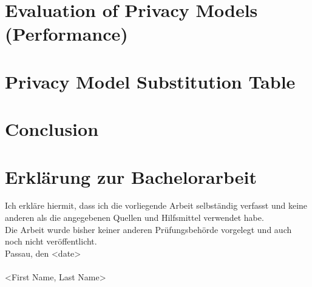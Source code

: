 \documentclass[12pt, a4paper,oneside]{report}
\begin{document}
\chapter{Evaluation of Privacy Models (Performance)}

\chapter{Privacy Model Substitution Table}

\chapter{Conclusion}










\newpage
\chapter*{Erklärung zur Bachelorarbeit}
Ich erkläre hiermit, dass ich die vorliegende Arbeit selbständig verfasst und keine anderen als die angegebenen Quellen und Hilfsmittel verwendet habe. \newline
\ \\
Die Arbeit wurde bisher keiner anderen Prüfungsbehörde vorgelegt und auch noch nicht veröffentlicht.\newline
\ \\
Passau, den <date>
\newline
\ \\
\ \\
<First Name, Last Name>
\end{document}
